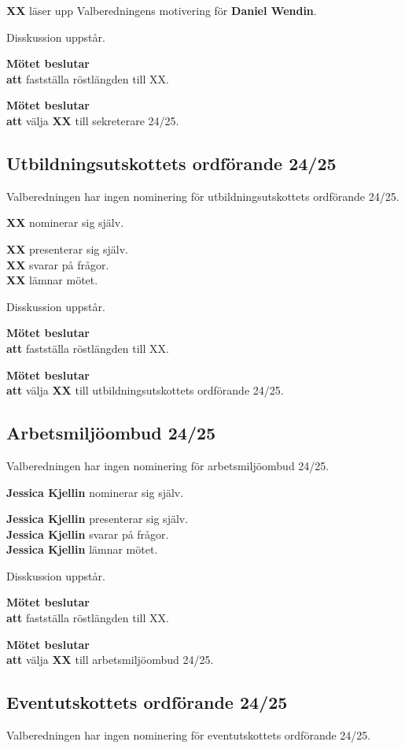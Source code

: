 \documentclass{datateknologsektionen-document}
\newcommand{\ind}{\hspace*{2em}}
\newcommand{\motetbeslutar}{\textbf{Mötet beslutar}}
\newcommand{\att}{\\\ind\textbf{att}}
\begin{document}
\textbf{XX} läser upp Valberedningens motivering för \textbf{Daniel Wendin}.

Disskussion uppstår.

\motetbeslutar
\att{} fastställa röstlängden till XX.

\motetbeslutar
\att{} välja \textbf{XX} till sekreterare 24/25.

\subsection{Utbildningsutskottets ordförande 24/25}

Valberedningen har ingen nominering för utbildningsutskottets ordförande 24/25.

\textbf{XX} nominerar sig själv.

\textbf{XX} presenterar sig själv.\\
\textbf{XX} svarar på frågor.\\
\textbf{XX} lämnar mötet.

Disskussion uppstår.

\motetbeslutar
\att{} fastställa röstlängden till XX.

\motetbeslutar
\att{} välja \textbf{XX} till utbildningsutskottets ordförande 24/25.

\subsection{Arbetsmiljöombud 24/25}

Valberedningen har ingen nominering för arbetsmiljöombud 24/25.

\textbf{Jessica Kjellin} nominerar sig själv.

\textbf{Jessica Kjellin} presenterar sig själv.\\
\textbf{Jessica Kjellin} svarar på frågor.\\
\textbf{Jessica Kjellin} lämnar mötet.

Disskussion uppstår.

\motetbeslutar
\att{} fastställa röstlängden till XX.

\motetbeslutar
\att{} välja \textbf{XX} till arbetsmiljöombud 24/25.

\subsection{Eventutskottets ordförande 24/25}

Valberedningen har ingen nominering för eventutskottets ordförande 24/25.
\end{document}
